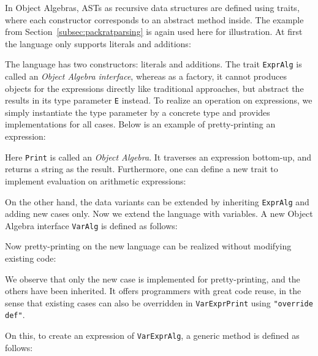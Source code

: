 In Object Algebras, ASTs as recursive data structures are defined using traits, where each constructor corresponds
to an abstract method inside. The example from Section~\ref{subsec:packratparsing} is again used here for illustration.
At first the language only supports literals and additions:

The language has two constructors: literals and additions. The trait \lstinline{ExprAlg} is called an \textit{Object Algebra interface},
whereas as a factory, it cannot produces objects for the expressions directly like traditional approaches, but abstract the results in its
type parameter \lstinline{E} instead. To realize an operation on expressions, we simply instantiate the type parameter by a concrete type and
provides implementations for all cases. Below is an example of pretty-printing an expression:

Here \lstinline{Print} is called an \textit{Object Algebra}. It traverses an expression bottom-up, and returns a string as the result.
Furthermore, one can define a new trait to implement evaluation on arithmetic expressions:


On the other hand, the data variants can be extended by inheriting \lstinline{ExprAlg} and adding new cases only. Now we extend the language
with variables. A new Object Algebra interface \lstinline{VarAlg} is defined as follows:

Now pretty-printing on the new language can be realized without modifying existing code:

We observe that only the new case is implemented for pretty-printing, and the others have been inherited.
It offers programmers with great code reuse, in the sense that existing cases can also be
overridden in \lstinline{VarExprPrint} using \lstinline{"override def"}.

On this, to create an expression of \lstinline{VarExprAlg}, a generic method is defined as follows:

